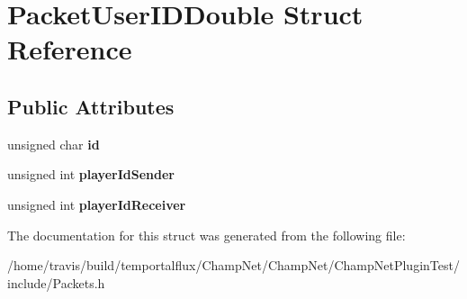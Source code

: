 \hypertarget{struct_packet_user_i_d_double}{\section{Packet\-User\-I\-D\-Double Struct Reference}
\label{struct_packet_user_i_d_double}
}
\subsection*{Public Attributes}
\begin{DoxyCompactItemize}
\item 
\hypertarget{struct_packet_user_i_d_double_aab2990fb8840c5bbbbaced392bea66f1}{unsigned char {\bfseries id}}\label{struct_packet_user_i_d_double_aab2990fb8840c5bbbbaced392bea66f1}

\item 
\hypertarget{struct_packet_user_i_d_double_aaa0532e70306102f0d275d2f6df1c3ff}{unsigned int {\bfseries player\-Id\-Sender}}\label{struct_packet_user_i_d_double_aaa0532e70306102f0d275d2f6df1c3ff}

\item 
\hypertarget{struct_packet_user_i_d_double_a92513f17c674d75301758a01dad58c55}{unsigned int {\bfseries player\-Id\-Receiver}}\label{struct_packet_user_i_d_double_a92513f17c674d75301758a01dad58c55}

\end{DoxyCompactItemize}


The documentation for this struct was generated from the following file\-:\begin{DoxyCompactItemize}
\item 
/home/travis/build/temportalflux/\-Champ\-Net/\-Champ\-Net/\-Champ\-Net\-Plugin\-Test/include/Packets.\-h\end{DoxyCompactItemize}
